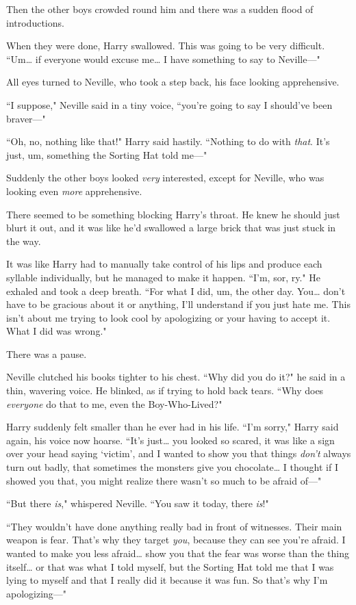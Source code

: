 Then the other boys crowded round him and there was a sudden flood of introductions.

When they were done, Harry swallowed. This was going to be very difficult. ``Um{\ldots} if everyone would excuse me{\ldots} I have something to say to Neville—"

All eyes turned to Neville, who took a step back, his face looking apprehensive.

``I suppose," Neville said in a tiny voice, ``you're going to say I should've been braver—"

``Oh, no, nothing like that!" Harry said hastily. ``Nothing to do with \emph{that}. It's just, um, something the Sorting Hat told me—"

Suddenly the other boys looked \emph{very} interested, except for Neville, who was looking even \emph{more} apprehensive.

There seemed to be something blocking Harry's throat. He knew he should just blurt it out, and it was like he'd swallowed a large brick that was just stuck in the way.

It was like Harry had to manually take control of his lips and produce each syllable individually, but he managed to make it happen. ``I'm, sor, ry." He exhaled and took a deep breath. ``For what I did, um, the other day. You{\ldots} don't have to be gracious about it or anything, I'll understand if you just hate me. This isn't about me trying to look cool by apologizing or your having to accept it. What I did was wrong."

There was a pause.

Neville clutched his books tighter to his chest. ``Why did you do it?" he said in a thin, wavering voice. He blinked, as if trying to hold back tears. ``Why does \emph{everyone} do that to me, even the Boy-Who-Lived?"

Harry suddenly felt smaller than he ever had in his life. ``I'm sorry," Harry said again, his voice now hoarse. ``It's just{\ldots} you looked so scared, it was like a sign over your head saying `victim', and I wanted to show you that things \emph{don't} always turn out badly, that sometimes the monsters give you chocolate{\ldots} I thought if I showed you that, you might realize there wasn't so much to be afraid of—"

``But there \emph{is}," whispered Neville. ``You saw it today, there \emph{is}!"

``They wouldn't have done anything really bad in front of witnesses. Their main weapon is fear. That's why they target \emph{you}, because they can see you're afraid. I wanted to make you less afraid{\ldots} show you that the fear was worse than the thing itself{\ldots} or that was what I told myself, but the Sorting Hat told me that I was lying to myself and that I really did it because it was fun. So that's why I'm apologizing—"

